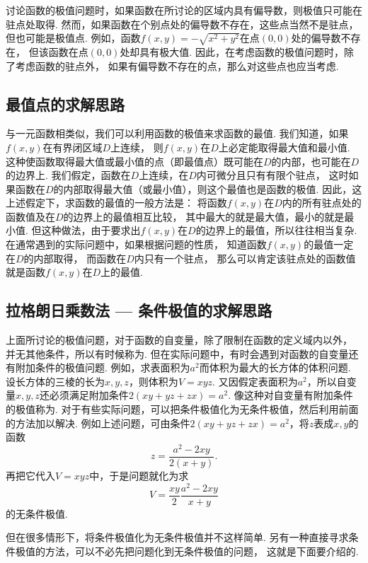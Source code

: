 讨论函数的极值问题时，如果函数在所讨论的区域内具有偏导数，则极值只可能在驻点处取得.
然而，如果函数在个别点处的偏导数不存在，这些点当然不是驻点，但也可能是极值点.
例如，函数\(f(x,y) = -\sqrt{x^2+y^2}\)在点\((0,0)\)处的偏导数不存在，
但该函数在点\((0,0)\)处却具有极大值.
因此，在考虑函数的极值问题时，除了考虑函数的驻点外，
如果有偏导数不存在的点，那么对这些点也应当考虑.

\subsection{最值点的求解思路}
与一元函数相类似，我们可以利用函数的极值来求函数的最值.
我们知道，如果\(f(x,y)\)在有界闭区域\(D\)上连续，
则\(f(x,y)\)在\(D\)上必定能取得最大值和最小值.
这种使函数取得最大值或最小值的点（即最值点）既可能在\(D\)的内部，也可能在\(D\)的边界上.
我们假定，函数在\(D\)上连续，在\(D\)内可微分且只有有限个驻点，
这时如果函数在\(D\)的内部取得最大值（或最小值），则这个最值也是函数的极值.
因此，这上述假定下，求函数的最值的一般方法是：
将函数\(f(x,y)\)在\(D\)内的所有驻点处的函数值及在\(D\)的边界上的最值相互比较，
其中最大的就是最大值，最小的就是最小值.
但这种做法，由于要求出\(f(x,y)\)在\(D\)的边界上的最值，所以往往相当复杂.
在通常遇到的实际问题中，如果根据问题的性质，
知道函数\(f(x,y)\)的最值一定在\(D\)的内部取得，
而函数在\(D\)内只有一个驻点，
那么可以肯定该驻点处的函数值就是函数\(f(x,y)\)在\(D\)上的最值.

\subsection{拉格朗日乘数法 --- 条件极值的求解思路}\label{subsection:多元函数微分法.拉格朗日乘数法}
上面所讨论的极值问题，对于函数的自变量，除了限制在函数的定义域内以外，
并无其他条件，所以有时候称为.
但在实际问题中，有时会遇到对函数的自变量还有附加条件的极值问题.
例如，求表面积为\(a^2\)而体积为最大的长方体的体积问题.
设长方体的三棱的长为\(x,y,z\)，则体积为\(V = xyz\).
又因假定表面积为\(a^2\)，所以自变量\(x,y,z\)还必须满足附加条件\(2(xy+yz+zx)=a^2\).
像这种对自变量有附加条件的极值称为.
对于有些实际问题，可以把条件极值化为无条件极值，然后利用前面的方法加以解决.
例如上述问题，可由条件\(2(xy+yz+zx)=a^2\)，将\(z\)表成\(x,y\)的函数\[
	z = \frac{a^2-2xy}{2(x+y)}.
\]
再把它代入\(V = xyz\)中，于是问题就化为求\[
	V = \frac{xy}{2} \frac{a^2-2xy}{x+y}
\]的无条件极值.

但在很多情形下，将条件极值化为无条件极值并不这样简单.
另有一种直接寻求条件极值的方法，可以不必先把问题化到无条件极值的问题，
这就是下面要介绍的.

